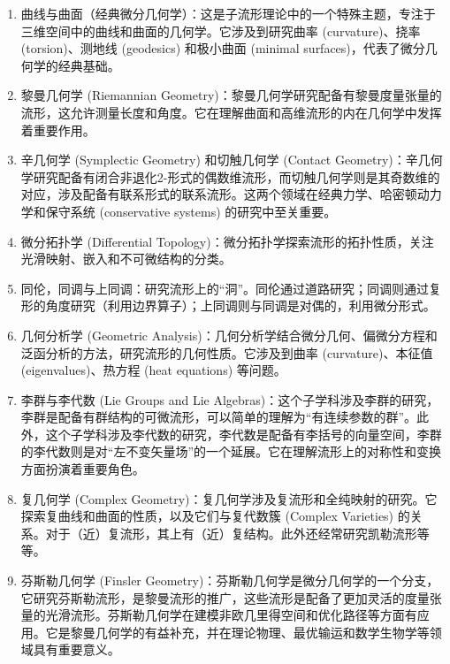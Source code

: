\begin{enumerate}
\item 曲线与曲面（经典微分几何学）：这是子流形理论中的一个特殊主题，专注于三维空间中的曲线和曲面的几何学。它涉及到研究曲率 (curvature)、挠率 (torsion)、测地线 (geodesics) 和极小曲面 (minimal surfaces)，代表了微分几何学的经典基础。

\item 黎曼几何学 (Riemannian Geometry)：黎曼几何学研究配备有黎曼度量张量的流形，这允许测量长度和角度。它在理解曲面和高维流形的内在几何学中发挥着重要作用。

\item 辛几何学 (Symplectic Geometry) 和切触几何学 (Contact Geometry)：辛几何学研究配备有闭合非退化2-形式的偶数维流形，而切触几何学则是其奇数维的对应，涉及配备有联系形式的联系流形。这两个领域在经典力学、哈密顿动力学和保守系统 (conservative systems) 的研究中至关重要。

\item 微分拓扑学 (Differential Topology)：微分拓扑学探索流形的拓扑性质，关注光滑映射、嵌入和不可微结构的分类。

\item 同伦，同调与上同调：研究流形上的“洞”。同伦通过道路研究；同调则通过复形的角度研究（利用边界算子）；上同调则与同调是对偶的，利用微分形式。

\item 几何分析学 (Geometric Analysis)：几何分析学结合微分几何、偏微分方程和泛函分析的方法，研究流形的几何性质。它涉及到曲率 (curvature)、本征值 (eigenvalues)、热方程 (heat equations) 等问题。

\item 李群与李代数 (Lie Groups and Lie Algebras)：这个子学科涉及李群的研究，李群是配备有群结构的可微流形，可以简单的理解为“有连续参数的群”。此外，这个子学科涉及李代数的研究，李代数是配备有李括号的向量空间，李群的李代数则是对“左不变矢量场”的一个延展。它在理解流形上的对称性和变换方面扮演着重要角色。

\item 复几何学 (Complex Geometry)：复几何学涉及复流形和全纯映射的研究。它探索复曲线和曲面的性质，以及它们与复代数簇 (Complex Varieties) 的关系。对于（近）复流形，其上有（近）复结构。此外还经常研究凯勒流形等等。

\item 芬斯勒几何学 (Finsler Geometry)：芬斯勒几何学是微分几何学的一个分支，它研究芬斯勒流形，是黎曼流形的推广，这些流形是配备了更加灵活的度量张量的光滑流形。芬斯勒几何学在建模非欧几里得空间和优化路径等方面有应用。它是黎曼几何学的有益补充，并在理论物理、最优输运和数学生物学等领域具有重要意义。
\end{enumerate}


